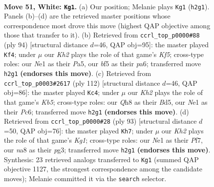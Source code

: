 \documentclass[11pt]{article}
\begin{document}
\clearpage

\begin{figure}[p]\centering
\begin{subfigure}{0.46\textwidth}\centering
\resizebox{\linewidth}{!}{%
\newchessgame
\chessboard[
  setfen={n6Q/8/8/1p3bk1/7p/P2P3q/7K/4N3 w - - 1 51},
  showmover=false,
  pgfstyle=straightmove, color=movearrow, markmove={h2-g1}
]}
\caption{}
\end{subfigure}\hfill
\begin{subfigure}{0.46\textwidth}\centering
\resizebox{\linewidth}{!}{%
\newchessgame
\chessboard[
  setfen={8/1Q4pk/p5q1/P4K2/8/1PP5/8/8 w - - 3 48},
  showmover=false,
  pgfstyle=straightmove, color=movearrow, markmove={f5-f4}
]}
\caption{}
\end{subfigure}
\\[4pt]
\begin{subfigure}{0.46\textwidth}\centering
\resizebox{\linewidth}{!}{%
\newchessgame
\chessboard[
  setfen={6k1/2b2pp1/1qP5/1K1BP2p/7P/5Q2/8/8 w - - 4 57},
  showmover=false,
  pgfstyle=straightmove, color=movearrow, markmove={b5-c4}
]}
\caption{}
\end{subfigure}\hfill
\begin{subfigure}{0.46\textwidth}\centering
\resizebox{\linewidth}{!}{%
\newchessgame
\chessboard[
  setfen={5Qk1/5pp1/7p/2B2q2/1p6/6PP/6K1/8 b - - 0 47},
  showmover=false,
  pgfstyle=straightmove, color=movearrow, markmove={g8-h7}
]}
\caption{}
\end{subfigure}
\caption{\textbf{Move 51, White: \texttt{Kg1}.} (a) Our position; Melanie plays \texttt{Kg1} (\texttt{h2g1}). Panels (b)--(d) are the retrieved master positions whose correspondence most drove this move (highest QAP objective among those that transfer to it). (b) Retrieved from \texttt{ccrl\_top\_p0000\#88} (ply 94) [structural distance $d$=46, QAP obj=95]: the master played \texttt{Kf4}; under $\mu$ our \emph{Kh2} plays the role of that game's \emph{Kf5}; cross-type roles: our \emph{N}e1 as their \emph{P}a5, our \emph{b}f5 as their \emph{p}a6; transferred move \texttt{h2g1} \textbf{(endorses this move)}. (c) Retrieved from \texttt{ccrl\_top\_p0003\#2617} (ply 112) [structural distance $d$=46, QAP obj=86]: the master played \texttt{Kc4}; under $\mu$ our \emph{Kh2} plays the role of that game's \emph{Kb5}; cross-type roles: our \emph{Q}h8 as their \emph{B}d5, our \emph{N}e1 as their \emph{P}c6; transferred move \texttt{h2g1} \textbf{(endorses this move)}. (d) Retrieved from \texttt{ccrl\_top\_p0000\#28} (ply 93) [structural distance $d$=50, QAP obj=76]: the master played \texttt{Kh7}; under $\mu$ our \emph{Kh2} plays the role of that game's \emph{Kg1}; cross-type roles: our \emph{N}e1 as their \emph{P}f7, our \emph{n}a8 as their \emph{p}g3; transferred move \texttt{h2g1} \textbf{(endorses this move)}. Synthesis: 23 retrieved analogs transferred to \texttt{Kg1} (summed QAP objective 1127, the strongest correspondence among the candidate moves); Melanie committed it via the \texttt{search} selector.}
\label{fig:thought-m100}
\end{figure}
\end{document}
